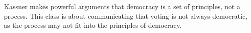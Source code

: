 Kassner makes powerful arguments that democracy is a set of principles, not a process.  This class is about communicating that voting is not always democratic, as the process may not fit into the principles of democracy.

